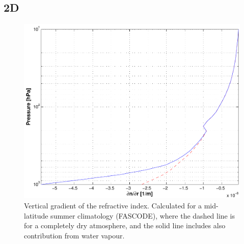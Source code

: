 \subsection{2D}
\label{sec:ppath:refr2D}
\begin{figure}[!t]
 \begin{center}
  \includegraphics*[width=0.85\hsize]{Figs/ppath/ppath_dndr}
  \caption{Vertical gradient of the refractive index.
     Calculated for a mid-latitude summer climatology (FASCODE), where
     the dashed line is for a completely dry atmosphere, and the solid line
     includes also contribution from water vapour.}
  \label{fig:ppath:dndr}  
 \end{center}
\end{figure}

